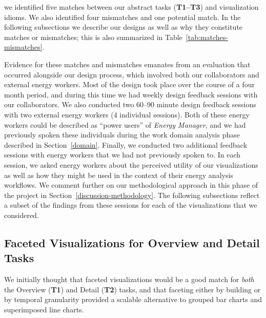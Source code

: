 \documentclass[journal]{vgtc}                %
\newcommand{\bstart}[1]{\vspace{1mm} \noindent{\textbf{#1:}}}
\begin{document}
\bstart{Matches \& mismatches} we identified five matches between our abstract tasks ({\bf T1--T3}) and visualization idioms. 
We also identified four mismatches and one potential match. 
In the following subsections we describe our designs as well as why they constitute matches or mismatches; this is also summarized in Table~\ref{tab:matches-mismatches}.

Evidence for these matches and mismatches emanates from an evaluation that occurred alongside our design process, which involved both our collaborators and external energy workers.
Most of the design took place over the course of a four month period, and during this time we had weekly design feedback sessions with our collaborators.
We also conducted two 60--90 minute design feedback sessions with two external energy workers (4 individual sessions).
Both of these energy workers could be described as ``power users'' of {\it Energy Manager}, and we had previously spoken these individuals during the work domain analysis phase described in Section~\ref{domain}.
Finally, we conducted two additional feedback sessions with energy workers that we had not previously spoken to.
In each session, we asked energy workers about the perceived utility of our visualizations as well as how they might be used in the context of their energy analysis workflows.
We comment further on our methodological approach in this phase of the project in Section~\ref{discussion-methodology}. 
The following subsections reflect a subset of the findings from these sessions for each of the visualizations that we considered.


\subsection{Faceted Visualizations for Overview and Detail Tasks}
\label{design-faceting}



We initially thought that faceted visualizations would be a good match for {\it both} the Overview ({\bf T1}) and Detail ({\bf T2}) tasks, and that faceting either by building or by temporal granularity provided a scalable alternative to grouped bar charts and superimposed line charts.
\end{document}
